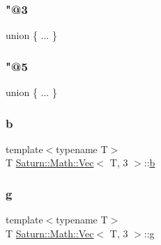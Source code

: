 \mbox{\label{class_saturn_1_1_math_1_1_vec_3_01_t_00_013_01_4_a52c587c9c2e803dd44945593bcfd2194}} 
\subsubsection{\texorpdfstring{"@3}{@3}}
{\footnotesize\ttfamily union \{ ... \} }

\mbox{\label{class_saturn_1_1_math_1_1_vec_3_01_t_00_013_01_4_a234d723a056dbd2533e50e4a14efbf72}} 
\subsubsection{\texorpdfstring{"@5}{@5}}
{\footnotesize\ttfamily union \{ ... \} }

\mbox{\label{class_saturn_1_1_math_1_1_vec_3_01_t_00_013_01_4_ac6a164b4c8a8232e4176c5e80d2e0f14}} 
\subsubsection{\texorpdfstring{b}{b}}
{\footnotesize\ttfamily template$<$typename T$>$ \\
T \mbox{\hyperlink{class_saturn_1_1_math_1_1_vec}{Saturn\+::\+Math\+::\+Vec}}$<$ T, 3 $>$\+::\mbox{\hyperlink{glad_8h_a6eba317e3cf44d6d26c04a5a8f197dcb}{b}}}

\mbox{\label{class_saturn_1_1_math_1_1_vec_3_01_t_00_013_01_4_aa13ed9474f1a239d4124571421275edd}} 
\subsubsection{\texorpdfstring{g}{g}}
{\footnotesize\ttfamily template$<$typename T$>$ \\
T \mbox{\hyperlink{class_saturn_1_1_math_1_1_vec}{Saturn\+::\+Math\+::\+Vec}}$<$ T, 3 $>$\+::\mbox{\hyperlink{glad_8h_a9cd653b1648845554169fbc3a3f6d37a}{g}}}

